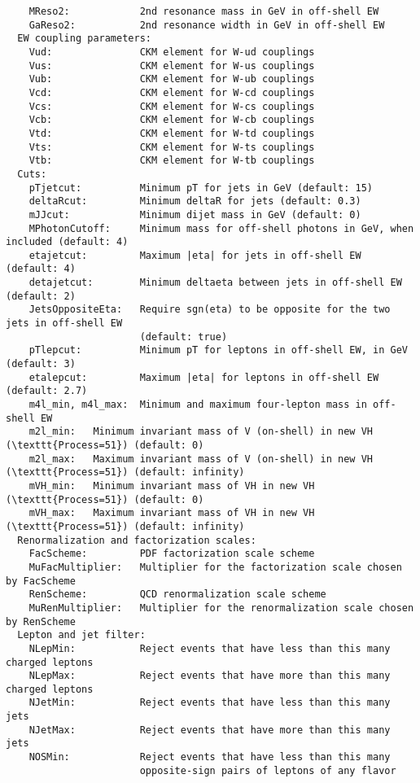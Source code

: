 \documentclass[aps,superscriptaddress,nofootinbib]{revtex4}
\begin{document}
\begin{verbatim}
    MReso2:            2nd resonance mass in GeV in off-shell EW
    GaReso2:           2nd resonance width in GeV in off-shell EW
  EW coupling parameters:
    Vud:               CKM element for W-ud couplings
    Vus:               CKM element for W-us couplings
    Vub:               CKM element for W-ub couplings
    Vcd:               CKM element for W-cd couplings
    Vcs:               CKM element for W-cs couplings
    Vcb:               CKM element for W-cb couplings
    Vtd:               CKM element for W-td couplings
    Vts:               CKM element for W-ts couplings
    Vtb:               CKM element for W-tb couplings
  Cuts:
    pTjetcut:          Minimum pT for jets in GeV (default: 15)
    deltaRcut:         Minimum deltaR for jets (default: 0.3)
    mJJcut:            Minimum dijet mass in GeV (default: 0)
    MPhotonCutoff:     Minimum mass for off-shell photons in GeV, when included (default: 4)
    etajetcut:         Maximum |eta| for jets in off-shell EW (default: 4)
    detajetcut:        Minimum deltaeta between jets in off-shell EW (default: 2)
    JetsOppositeEta:   Require sgn(eta) to be opposite for the two jets in off-shell EW
                       (default: true)
    pTlepcut:          Minimum pT for leptons in off-shell EW, in GeV (default: 3)
    etalepcut:         Maximum |eta| for leptons in off-shell EW (default: 2.7)
    m4l_min, m4l_max:  Minimum and maximum four-lepton mass in off-shell EW
    m2l_min:   Minimum invariant mass of V (on-shell) in new VH (\texttt{Process=51}) (default: 0)
    m2l_max:   Maximum invariant mass of V (on-shell) in new VH (\texttt{Process=51}) (default: infinity)
    mVH_min:   Minimum invariant mass of VH in new VH (\texttt{Process=51}) (default: 0)
    mVH_max:   Maximum invariant mass of VH in new VH (\texttt{Process=51}) (default: infinity)
  Renormalization and factorization scales:
    FacScheme:         PDF factorization scale scheme
    MuFacMultiplier:   Multiplier for the factorization scale chosen by FacScheme
    RenScheme:         QCD renormalization scale scheme
    MuRenMultiplier:   Multiplier for the renormalization scale chosen by RenScheme
  Lepton and jet filter:
    NLepMin:           Reject events that have less than this many charged leptons
    NLepMax:           Reject events that have more than this many charged leptons
    NJetMin:           Reject events that have less than this many jets
    NJetMax:           Reject events that have more than this many jets
    NOSMin:            Reject events that have less than this many
                       opposite-sign pairs of leptons of any flavor

\end{verbatim}
\end{document}
